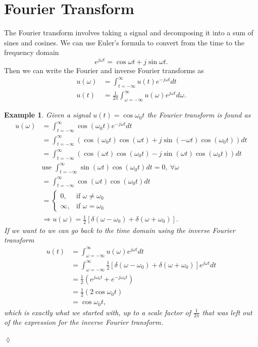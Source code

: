 \documentclass[lecture,12pt,]{pcms-l}
\theoremstyle{example}
\newtheorem{example}{Example}[section]
\newcommand{\tint}{\int_{t=-\infty}^\infty}
\newcommand{\fint}{\int_{\omega=-\infty}^\infty}
\newcommand{\w}{\omega}
\newcommand{\wo}{\omega_0}
\begin{document}
\section{Fourier Transform}
The Fourier transform involves taking a signal and decomposing it into a sum of sines and cosines. We can use Euler's formula to convert from the time to the frequency domain
$$e^{j\w t} = \cos\w t + j\sin\w t.$$
Then we can write the Fourier and inverse Fourier transforms as
\begin{align*}
u(\w) &= \tint u(t)e^{-j\w t}dt \\
u(t) &= \frac{1}{2\pi} \fint u(\w)e^{j\w t}d\w.
\end{align*}

\begin{example}
Given a signal $u(t)=\cos\wo t$ the Fourier transform is found as
\begin{align*}
u(\w) &= \tint \cos(\wo t)e^{-j\w t}dt \\
&= \tint \left(\cos(\wo t)\cos(\w t) + j\sin(-\w t)\cos(\wo t)\right)dt \\
&= \tint \left(\cos(\w t)\cos(\wo t) - j\sin(\w t)\cos(\wo t)\right)dt \\
&\text{use }\tint \sin(\w t)\cos(\wo t)dt = 0, ~ \forall \w \\
&= \tint \cos(\w t)\cos(\wo t)dt \\
&= \begin{cases} 0, & \text{if } \w \neq \wo \\ \infty, & \text{if } \w = \wo \end{cases} \\
&\Rightarrow u(\w) = \frac{1}{2} \left[\delta(\w-\wo) + \delta(\w+\wo)\right].
\end{align*}
If we want to we can go back to the time domain using the inverse Fourier transform
\begin{align*}
u(t) &= \fint u(\w)e^{j\w t}dt \\
&= \fint \frac{1}{2} \left[\delta(\w-\wo) + \delta(\w+\wo)\right] e^{j\w t}dt \\
&= \frac{1}{2}\left(e^{j\wo t} + e^{-j\wo t}\right) \\
&= \frac{1}{2}\left(2\cos\wo t\right) \\
&= \cos\wo t,
\end{align*}
which is exactly what we started with, up to a scale factor of $\frac{1}{2\pi}$ that was left out of the expression for the inverse Fourier transform.
\end{example}
$\lozenge$
\end{document}
